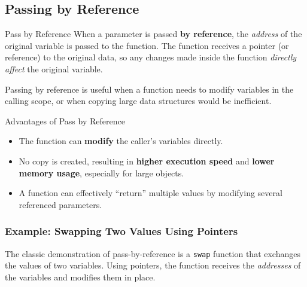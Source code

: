 \subsection{Passing by Reference}
\label{subsec:pass-by-reference}

\begin{definitionbox}{Pass by Reference}
When a parameter is passed \textbf{by reference}, the \emph{address} of the
original variable is passed to the function. The function receives a pointer
(or reference) to the original data, so any changes made inside the function
\emph{directly affect} the original variable.
\end{definitionbox}

Passing by reference is useful when a function needs to modify variables in
the calling scope, or when copying large data structures would be inefficient.

\begin{importantbox}{Advantages of Pass by Reference}
\begin{itemize}
    \item The function can \textbf{modify} the caller's variables directly.
    \item No copy is created, resulting in \textbf{higher execution speed} and
          \textbf{lower memory usage}, especially for large objects.
    \item A function can effectively ``return'' multiple values by modifying
          several referenced parameters.
\end{itemize}
\end{importantbox}

\subsubsection{Example: Swapping Two Values Using Pointers}

The classic demonstration of pass-by-reference is a \texttt{swap} function
that exchanges the values of two variables. Using pointers, the function
receives the \emph{addresses} of the variables and modifies them in place.

